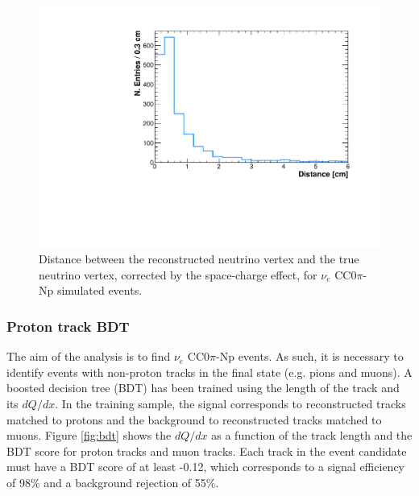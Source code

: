 \begin{figure}[htbp]
\centering
  \includegraphics[width=0.7\linewidth]{figures/dist.pdf}
  \caption{Distance between the reconstructed neutrino vertex and the true neutrino vertex, corrected by the space-charge effect, for $\nu_{e}$ CC0$\pi$-Np simulated events.}\label{fig:dist}
\end{figure}

\subsubsection{Proton track BDT}\label{sec:protbdt}
The aim of the analysis is to find $\nu_{e}$ CC$0\pi$-Np events. As such, it is necessary to identify events with non-proton tracks in the final state (e.g. pions and muons). A boosted decision tree (BDT) has been trained using the length of the track and its $dQ/dx$. In the training sample, the signal corresponds to reconstructed tracks matched to protons and the background to reconstructed tracks matched to muons. Figure \ref{fig:bdt} shows the $dQ/dx$ as a function of the track length and the BDT score for proton tracks and muon tracks. Each track in the event candidate must have a BDT score of at least -0.12, which corresponds to a signal efficiency of 98\% and a background rejection of 55\%. 

